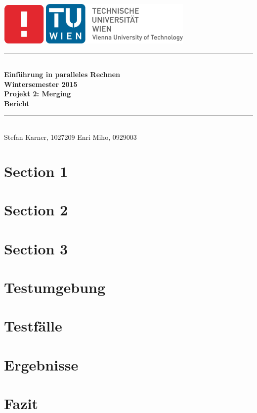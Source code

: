 \documentclass[a4paper,12pt]{article}
\begin{document}
\thispagestyle{empty}
\begin{center}
 \includegraphics[width=0.16\textwidth]{resources/informatik_logo}
\includegraphics[width=0.55\textwidth]{resources/tu_logo}\\[1cm]
\newcommand{\HRule}{\rule{\linewidth}{0.5mm}}
\HRule \\[0.4cm]
{ \Large \bfseries Einführung in paralleles Rechnen\\
Wintersemester 2015\\ [0.2cm]
Projekt 2: Merging \\ [0.2cm]
Bericht}\\[0.4cm]

\HRule \\[1.5cm]
{\large
Stefan Karner, 1027209 \hfill Enri Miho, 0929003
}
\end{center}

\newpage
\tableofcontents
\newpage
\section{Section 1}
\section{Section 2}
\section{Section 3}

\section{Testumgebung}
	
	
\section{Testfälle}
	
	
\section{Ergebnisse}
	
	
\section{Fazit}
	

\newpage


\end{document}
